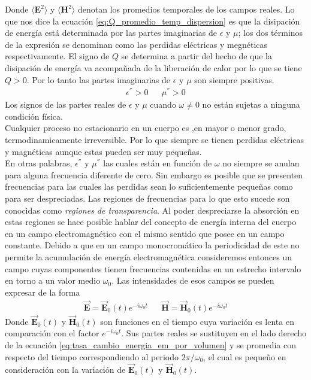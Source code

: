 \documentclass[../tesis_main_file.tex]{subfiles}
\begin{document}
Donde $\langle\textbf{E}^2\rangle$ y $\langle\textbf{H}^2\rangle$ denotan los promedios temporales de los campos reales.
Lo que nos dice la ecuación \ref{eq:Q_promedio_temp_dispersion} es que la disipación de energía está determinada por las partes imaginarias de $\epsilon$ y  $\mu$; los dos términos de la expresión se denominan como las perdidas eléctricas y megnéticas respectivamente. El signo de $Q$ se determina a partir del hecho de que la disipación de energía va acompañada de la liberación de calor por lo que se tiene $Q>0$. Por lo tanto las partes imaginarias de $\epsilon$ y $\mu$ son siempre positivas.
\begin{align}
\epsilon^{''} > 0 & &\mu^{''} > 0
\end{align}
Los signos de las partes reales de $\epsilon$ y $\mu$ cuando $\omega\neq0$ no están sujetas a ninguna condición física.\\
Cualquier proceso no estacionario en un cuerpo es ,en mayor o menor grado, termodinamicamente irreversible. Por lo que siempre se tienen perdidas eléctricas y magnéticas aunque estas pueden ser muy pequeñas.\\
En otras palabras, $\epsilon ^{''}$ y $\mu ^{''}$ las cuales están en función de $\omega$ no siempre se anulan para alguna frecuencia diferente de cero. Sin embargo es posible que se presenten frecuencias para las cuales las perdidas sean lo suficientemente pequeñas como para ser despreciadas. Las regiones de frecuencias para lo que esto sucede son conocidas como \textit{regiones de transparencia}\cite{Landau1690Electro_media}. Al poder despreciarse la absorción en estas regiones se hace posible hablar del concepto de energía interna del cuerpo en un campo electromagnético con el mismo sentido que posee en un campo constante. Debido a que en un campo monocromático la periodicidad de este no permite la acumulación de energía electromagnética consideremos entonces un campo cuyas componentes tienen frecuencias contenidas en un estrecho intervalo en torno a un valor medio $\omega_0$. Las intensidades de esos campos se pueden expresar de la forma
\begin{align}
\label{eq:campos_no_monocromaticos}
\overrightarrow{\textbf{E}} = \overrightarrow{\textbf{E}}_0(t)e^{-i\omega_0 t} & &\overrightarrow{\textbf{H}} = \overrightarrow{\textbf{H}}_0(t)e^{-i\omega_0 t}
\end{align}
Donde $\overrightarrow{\textbf{E}}_0(t)$ y $\overrightarrow{\textbf{H}}_0(t)$ son funciones en el tiempo cuya variación es lenta en comparación con el factor $e^{-i\omega_0 t}$. Sus partes reales se sustituyen en el lado derecho de la ecuación \ref{eq:tasa_cambio_energia_em_por_volumen} y se promedia con respecto del tiempo correspondiendo al periodo $2\pi / \omega_0$, el cual es pequeño en consideración con la variación de $\overrightarrow{\textbf{E}}_0(t)$ y $\overrightarrow{\textbf{H}}_0(t)$.\\
\end{document}
